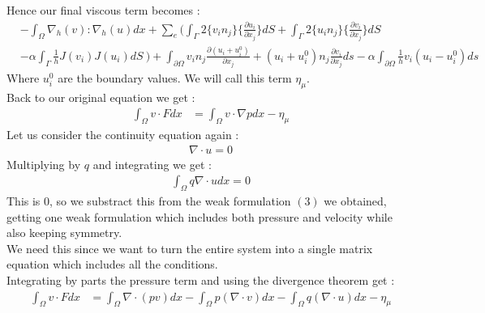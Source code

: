\documentclass[11pt,twoside,a4paper]{article}
\begin{document}
 Hence our final viscous term becomes :\\
\begin{align*}
&-  \int_\Omega \nabla_h(v) : \nabla_h(u) dx + \sum_e ( \int_\Gamma 2 \{ v_i n_j \} \{ \frac{\partial u_i}{\partial x_j}\} dS + \int_\Gamma 2 \{ u_i n_j \} \{ \frac{\partial v_i}{\partial x_j}\} dS \\
&- \alpha \int_\Gamma \frac{1}{h}  J(v_i) J(u_i) dS \ ) + \int_{\partial  \Omega} v_i n_j \frac{\partial(u_i + u^0_i)}{\partial x_j} + (u_i + u^0_i) n_j\frac{\partial v_i}{\partial x_j} ds - \alpha \int_{\partial \Omega} \frac{1}{h} v_i(u_i-u^0_i)ds
\end{align*}
Where $u^0_i$ are the boundary values.
We will call this term $\eta_\mu$.\\
Back to our original equation we get : 
\begin{align}
\int_\Omega v \cdot F dx &= \int_\Omega v \cdot \nabla p dx - \eta_\mu
\end{align}
Let us consider the continuity equation again :
\begin{align*}
\nabla \cdot u = 0
\end{align*}
Multiplying by $q$ and integrating we get :
\begin{align*}
\int_\Omega q \nabla \cdot u dx = 0
\end{align*}
This is $0$, so we substract this from the weak formulation $(3)$ we obtained, getting one weak formulation which includes both pressure and velocity while also keeping symmetry. \\
We need this since we want to turn the entire system into a single matrix equation which includes all the conditions.\\
Integrating by parts the pressure term and using the divergence theorem get :
\begin{align}
\int_\Omega v \cdot F dx &= \int_\Omega \nabla \cdot (p v) dx - \int_\Omega  p ( \nabla \cdot v) dx - \int_\Omega q (\nabla \cdot u) dx  - \eta_\mu
\end{align}
\end{document}
